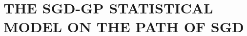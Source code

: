 \documentclass{wscpaperproc}
\newcommand{\pfcomment}[1]{{\color{red} PF: #1}}
\theoremstyle{wsc}
\begin{document}







\section{THE SGD-GP STATISTICAL MODEL ON THE PATH OF SGD}
\label{statistical_model}
\end{document}
